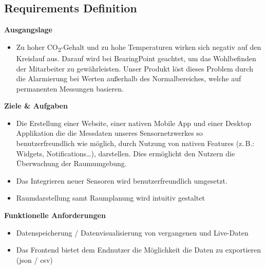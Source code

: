 \documentclass{article}
\begin{document}
\subsection{Requirements Definition}

\noindent\textbf{Ausgangslage}
\begin{itemize}
  \item Zu hoher CO\textsubscript{2}-Gehalt und zu hohe Temperaturen wirken sich negativ auf den Kreislauf aus. Darauf wird bei BearingPoint geachtet, um das Wohlbefinden der Mitarbeiter zu gewährleisten. Unser Produkt löst dieses Problem durch die Alarmierung bei Werten außerhalb des Normalbereiches, welche auf permanenten Messungen basieren.
\end{itemize}

\noindent\textbf{Ziele \& Aufgaben}
\begin{itemize}
  \item Die Erstellung einer Website, einer nativen Mobile App und einer Desktop Applikation die die Messdaten unseres Sensornetzwerkes so benutzerfreundlich wie möglich, durch Nutzung von nativen Features (z.\,B.: Widgets, Notifications…), darstellen. Dies ermöglicht den Nutzern die Überwachung der Raumumgebung.
  \item Das Integrieren neuer Sensoren wird benutzerfreundlich umgesetzt.
  \item Raumdarstellung samt Raumplanung wird intuitiv gestaltet
\end{itemize}

\noindent\textbf{Funktionelle Anforderungen}
\begin{itemize}
  \item Datenspeicherung / Datenvisualisierung von vergangenen und Live-Daten
  \item Das Frontend bietet dem Endnutzer die Möglichkeit die Daten zu exportieren (json / csv)
\end{itemize}
\end{document}
